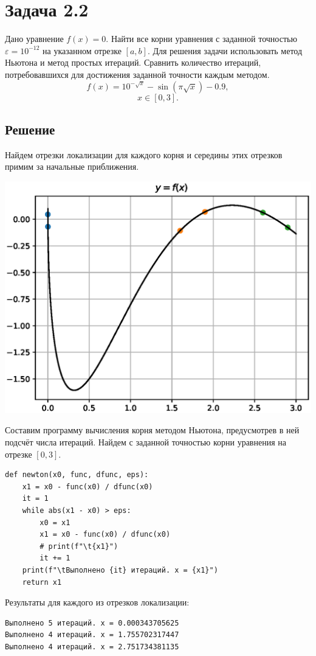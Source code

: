 \section*{Задача 2.2}
Дано уравнение $f(x) = 0$. Найти все корни уравнения с заданной точностью $\varepsilon = 10^{-12}$ на указанном отрезке $[a, b]$. Для решения задачи использовать метод Ньютона и метод простых итераций. Сравнить количество итераций, потребовавшихся для достижения заданной точности каждым методом.
\[f(x) = 10^{-\sqrt{x}}- \sin(\pi \sqrt{x})- 0.9,\]
\[x \in [0, 3].\]

\subsection*{Решение}
Найдем отрезки локализации для каждого корня и середины этих отрезков примим за начальные приближения.

\includegraphics[width=\textwidth]{221.eps}

Составим программу вычисления корня методом Ньютона, предусмотрев в ней подсчёт числа итераций. Найдем с заданной точностью корни уравнения на отрезке $[0, 3]$.

\begin{verbatim}
def newton(x0, func, dfunc, eps):
    x1 = x0 - func(x0) / dfunc(x0)
    it = 1
    while abs(x1 - x0) > eps:
        x0 = x1
        x1 = x0 - func(x0) / dfunc(x0)
        # print(f"\t{x1}")
        it += 1
    print(f"\tВыполнено {it} итераций. x = {x1}")
    return x1
\end{verbatim}

Результаты для каждого из отрезков локализации:
\begin{verbatim}
Выполнено 5 итераций. x = 0.000343705625
Выполнено 4 итераций. x = 1.755702317447
Выполнено 4 итераций. x = 2.751734381135
\end{verbatim}

